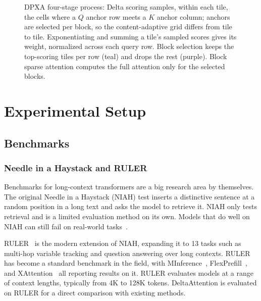 \begin{figure}[ht]
{
}
\caption{DPXA four-stage process: Delta scoring samples, within each tile, the cells where a $Q$ anchor row meets a $K$ anchor column; anchors are selected per block, so the content-adaptive grid differs from tile to tile. Exponentiating and summing a tile's sampled scores gives its weight, normalized across each query row. Block selection keeps the top-scoring tiles per row (teal) and drops the rest (purple). Block sparse attention computes the full attention only for the selected blocks.}
\label{fig:dpxa_3part}
\end{figure}

\section{Experimental Setup}

\subsection{Benchmarks}

\subsubsection{Needle in a Haystack and RULER}

Benchmarks for long-context transformers are a big research area by themselves. The original Needle in a Haystack (NIAH) test inserts a distinctive sentence at a random position in a long text and asks the model to retrieve it. NIAH only tests retrieval and is a limited evaluation method on its own. Models that do well on NIAH can still fail on real-world tasks~\cite{kuratov2024babilong}.

RULER~\cite{hsieh2024ruler} is the modern extension of NIAH, expanding it to 13 tasks such as multi-hop variable tracking and question answering over long contexts. RULER has become a standard benchmark in the field, with MInference~\cite{jiang2024minference}, FlexPrefill~\cite{lai2025flexprefill}, and XAttention~\cite{xu2025xattention} all reporting results on it. RULER evaluates models at a range of context lengths, typically from 4K to 128K tokens. DeltaAttention is evaluated on RULER for a direct comparison with existing methods.

